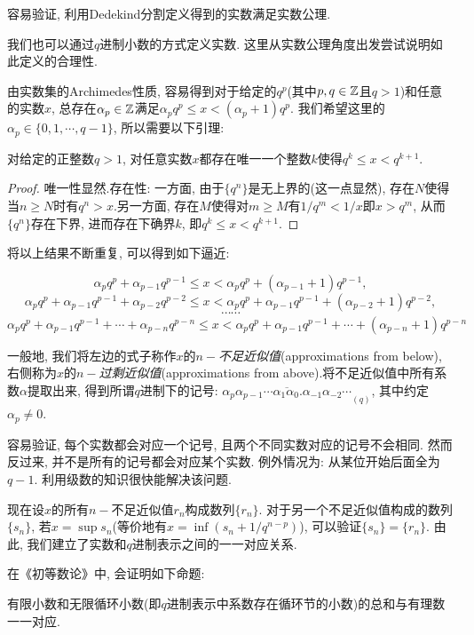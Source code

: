 容易验证, 利用Dedekind分割定义得到的实数满足实数公理. 

我们也可以通过$q$进制小数的方式定义实数. 这里从实数公理角度出发尝试说明如此定义的合理性. 

由实数集的Archimedes性质, 容易得到对于给定的$q^p$(其中$p, q \in \mathbb{Z}$且$q>1$)和任意的实数$x$, 总存在$\alpha _p \in \mathbb{Z}$满足$\alpha _p q^p \leq x < (\alpha _p +1)q^p$. 我们希望这里的$\alpha _p \in \{ 0, 1, \cdots , q-1 \}$, 所以需要以下引理: 

\begin{lemma}{} \label{lem:jxqlajimide}
	对给定的正整数$q>1$, 对任意实数$x$都存在唯一一个整数$k$使得$q^{k} \leq x < q^{k+1}$.
\end{lemma}
\begin{proof}
	唯一性显然.存在性: 一方面, 由于$\{ q^n \}$是无上界的(这一点显然), 存在$N$使得当$n \geq N$时有$q^n > x$.另一方面, 存在$M$使得对$m \geq M$有$1/q^m < 1/x$即$x > q^m$, 从而$\{ q^n \}$存在下界, 进而存在下确界$k$, 即$q^k \leq x < q^{k+1}$. 
\end{proof}

将以上结果不断重复, 可以得到如下逼近: 

$$\alpha _p q^p + \alpha _{p-1}q^{p-1} \leq x < \alpha _p q^p + (\alpha _{p-1}+1) q^{p-1}, $$
$$\alpha _p q^p + \alpha _{p-1}q^{p-1} + \alpha _{p-2}q^{p-2}  \leq x < \alpha _p q^p + \alpha _{p-1}q^{p-1} + (\alpha _{p-2}+1)q^{p-2} , $$
$$\cdots \cdots $$
$$\alpha _p q^p + \alpha _{p-1}q^{p-1} + \cdots + \alpha _{p-n}q^{p-n}  \leq x < \alpha _p q^p + \alpha _{p-1}q^{p-1} + \cdots + (\alpha _{p-n}+1)q^{p-n}$$

一般地, 我们将左边的式子称作$x$的$n-$\textit{不足近似值}(approximations from below), 右侧称为$x$的$n-$\textit{过剩近似值}(approximations from above).将不足近似值中所有系数$\alpha$提取出来, 得到所谓$q$进制下的记号: $\overline{\alpha_p \alpha_{p-1} \cdots \alpha_1 \alpha _0 . \alpha_{-1}\alpha_{-2} \cdots}_{(q)}$, 其中约定$\alpha_p \neq 0$.

容易验证, 每个实数都会对应一个记号, 且两个不同实数对应的记号不会相同. 然而反过来, 并不是所有的记号都会对应某个实数. 例外情况为: 从某位开始后面全为$q-1$. 利用级数的知识很快能解决该问题. 

现在设$x$的所有$n-$不足近似值$r_n$构成数列$\{ r_n \}$. 对于另一个不足近似值构成的数列$\{ s_n \}$, 若$x=\sup s_n$(等价地有$x=\inf (s_n+1/q^{n-p})$), 可以验证$\{ s_n \}=\{ r_n \}$. 由此, 我们建立了实数和$q$进制表示之间的一一对应关系. 

在《初等数论》中, 会证明如下命题: 

\begin{proposition}{}
	有限小数和无限循环小数(即$q$进制表示中系数存在循环节的小数)的总和与有理数一一对应.
\end{proposition}


